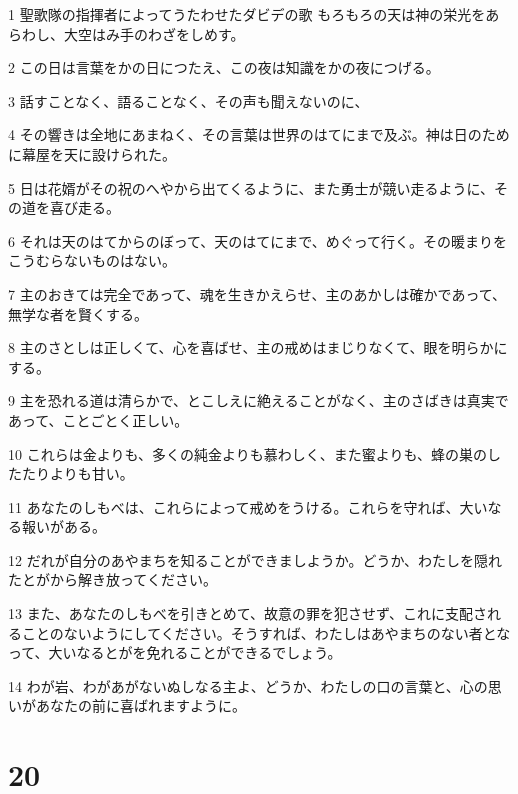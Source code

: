 \par 1 聖歌隊の指揮者によってうたわせたダビデの歌 もろもろの天は神の栄光をあらわし、大空はみ手のわざをしめす。
\par 2 この日は言葉をかの日につたえ、この夜は知識をかの夜につげる。
\par 3 話すことなく、語ることなく、その声も聞えないのに、
\par 4 その響きは全地にあまねく、その言葉は世界のはてにまで及ぶ。神は日のために幕屋を天に設けられた。
\par 5 日は花婿がその祝のへやから出てくるように、また勇士が競い走るように、その道を喜び走る。
\par 6 それは天のはてからのぼって、天のはてにまで、めぐって行く。その暖まりをこうむらないものはない。
\par 7 主のおきては完全であって、魂を生きかえらせ、主のあかしは確かであって、無学な者を賢くする。
\par 8 主のさとしは正しくて、心を喜ばせ、主の戒めはまじりなくて、眼を明らかにする。
\par 9 主を恐れる道は清らかで、とこしえに絶えることがなく、主のさばきは真実であって、ことごとく正しい。
\par 10 これらは金よりも、多くの純金よりも慕わしく、また蜜よりも、蜂の巣のしたたりよりも甘い。
\par 11 あなたのしもべは、これらによって戒めをうける。これらを守れば、大いなる報いがある。
\par 12 だれが自分のあやまちを知ることができましようか。どうか、わたしを隠れたとがから解き放ってください。
\par 13 また、あなたのしもべを引きとめて、故意の罪を犯させず、これに支配されることのないようにしてください。そうすれば、わたしはあやまちのない者となって、大いなるとがを免れることができるでしょう。
\par 14 わが岩、わがあがないぬしなる主よ、どうか、わたしの口の言葉と、心の思いがあなたの前に喜ばれますように。

\chapter{20}

